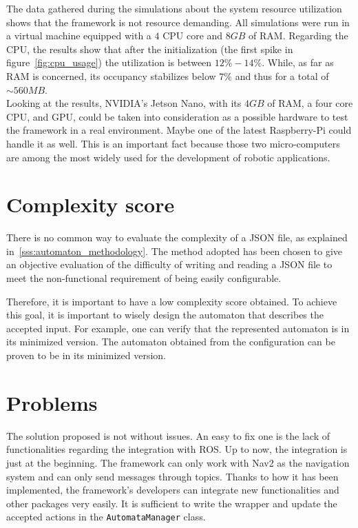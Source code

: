 \documentclass[../thesis.tex]{subfiles}
\begin{document}
The data gathered during the simulations about the system resource utilization shows that the framework is not resource demanding. All simulations were run in a virtual machine equipped with a $4$ CPU core and $8GB$ of RAM. Regarding the CPU, the results show that after the initialization (the first spike in figure~\ref{fig:cpu_usage}) the utilization is between $12\% -14\%$. While, as far as RAM is concerned, its occupancy stabilizes below $7\%$ and thus for a total of $\sim 560MB$.\\

Looking at the results, NVIDIA's Jetson Nano, with its $4GB$ of RAM, a four core CPU, and GPU, could be taken into consideration as a possible hardware to test the framework in a real environment. Maybe one of the latest Raspberry-Pi could handle it as well. This is an important fact because those two micro-computers are among the most widely used for the development of robotic applications.
 
\section{Complexity score}
There is no common way to evaluate the complexity of a JSON file, as explained in~\ref{sss:automaton_methodology}. The method adopted has been chosen to give an objective evaluation of the difficulty of writing and reading a JSON file to meet the non-functional requirement of being easily configurable.

Therefore, it is important to have a low complexity score obtained. To achieve this goal, it is important to wisely design the automaton that describes the accepted input. For example, one can verify that the represented automaton is in its minimized version. The automaton obtained from the configuration can be proven to be in its minimized version.

\section{Problems}
The solution proposed is not without issues. An easy to fix one is the lack of functionalities regarding the integration with \gls{ROS}. Up to now, the integration is just at the beginning. The framework can only work with Nav2 as the navigation system and can only send messages through topics. Thanks to how it has been implemented, the framework's developers can integrate new functionalities and other packages very easily. It is sufficient to write the wrapper and update the accepted actions in the \texttt{AutomataManager} class.
\end{document}
